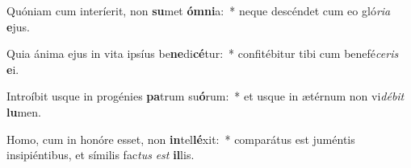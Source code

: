 \item Quóniam cum interíerit, non \textbf{su}met \textbf{óm}\textbf{ni}a:~* neque descéndet cum eo gló\textit{ri}\textit{a} \textbf{e}jus.
\item Quia ánima ejus in vita ipsíus be\textbf{ne}di\textbf{cé}tur:~* confitébitur tibi cum benefé\textit{ce}\textit{ris} \textbf{e}i.
\item Introíbit usque in progénies \textbf{pa}trum su\textbf{ó}rum:~* et usque in ætérnum non vi\textit{dé}\textit{bit} \textbf{lu}men.
\item Homo, cum in honóre esset, non \textbf{in}tel\textbf{lé}xit:~* comparátus est juméntis insipiéntibus, et símilis fac\textit{tus} \textit{est} \textbf{il}lis.
